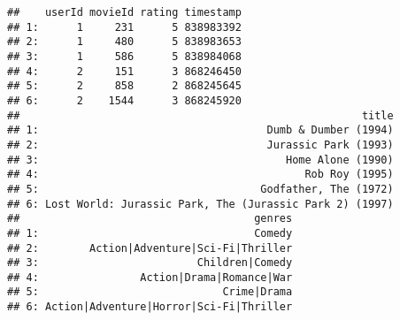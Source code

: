\documentclass[
]{article}
\begin{document}
\begin{verbatim}
##    userId movieId rating timestamp
## 1:      1     231      5 838983392
## 2:      1     480      5 838983653
## 3:      1     586      5 838984068
## 4:      2     151      3 868246450
## 5:      2     858      2 868245645
## 6:      2    1544      3 868245920
##                                                      title
## 1:                                    Dumb & Dumber (1994)
## 2:                                    Jurassic Park (1993)
## 3:                                       Home Alone (1990)
## 4:                                          Rob Roy (1995)
## 5:                                   Godfather, The (1972)
## 6: Lost World: Jurassic Park, The (Jurassic Park 2) (1997)
##                                     genres
## 1:                                  Comedy
## 2:        Action|Adventure|Sci-Fi|Thriller
## 3:                         Children|Comedy
## 4:                Action|Drama|Romance|War
## 5:                             Crime|Drama
## 6: Action|Adventure|Horror|Sci-Fi|Thriller
\end{verbatim}
\end{document}
